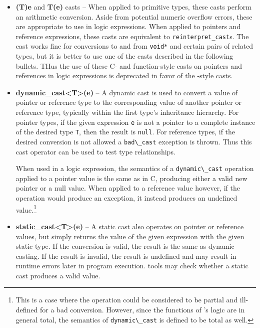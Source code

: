 \begin{itemize}
	\item \textbf{(T)e} and \textbf{T(e)} casts -- When applied to primitive types, these casts perform an arithmetic conversion. Aside from potential numeric overflow errors, these are appropriate to use in logic expressions. When applied to pointers and reference expressions, these casts are equivalent to
	\lstinline|reinterpret_cast|s. The cast works fine for conversions to and from \lstinline|void*| and certain pairs of related types, but it is better to use one of
	the \lang{} casts described in the following bullets.
	THus the use of these C- and function-style casts on 
	pointers and references in logic expressions is 
	deprecated in favor of the \lang{}-style casts.
	
	\item \textbf{dynamic\_cast<T>(e)} -- A dynamic cast is used to convert a value of pointer or reference type to the corresponding value of another pointer or reference type, typically within the first type's inheritance hierarchy. For pointer types, if the given expression \lstinline|e| is not a pointer to a complete instance of the desired type \lstinline|T|, then the result is \lstinline|null|. For reference types, if the desired conversion is not allowed a \lstinline|bad\_cast| exception is thrown. Thus this cast operator can be used to test type relationships.
	
	When used in a logic expression, the semantics of a \lstinline|dynamic\_cast| operation applied to a pointer value is the same as in C, producing either a valid new pointer or a null value. When applied to a reference value however, if the operation would produce an exception, it instead produces an undefined value.\footnote{This is a case where the operation could be considered to be partial and ill-defined for a bad conversion. However, since the  functions of \NAME{}'s logic are in general total, the semantics of \lstinline|dynamic\_cast| is defined to be total as well.}  
	
	\item \textbf{static\_cast<T>(e)} -- A static cast also operates on pointer or reference values, but simply returns the value of the given expression with the given static type. If the conversion is valid, the result is the same as dynamic casting. If the result is invalid, the result is undefined and may result in runtime errors later in program execution. \NAME{} tools may check whether a static cast produces a valid value.
	

\end{itemize}
